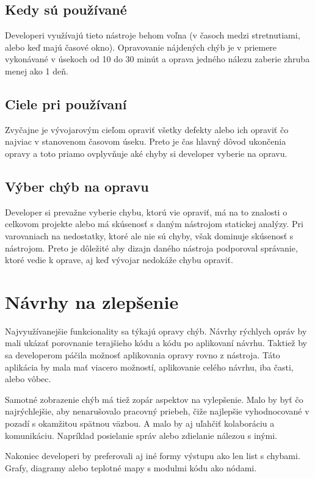 \documentclass[10pt,twoside,slovak,a4paper]{article}
\begin{document}
\subsection*{Kedy sú používané}
Developeri využívajú tieto nástroje behom voľna (v časoch medzi stretnutiami, alebo keď majú časové okno). Opravovanie
nájdených chýb je v priemere vykonávané v úsekoch od 10 do 30 minút a oprava jedného nálezu zaberie zhruba menej ako 1 deň.

\subsection*{Ciele pri používaní}
Zvyčajne je vývojarovým cieľom opraviť všetky defekty alebo ich opraviť čo najviac v stanovenom časovom úseku. Preto
je čas hlavný dôvod ukončenia opravy a toto priamo ovplyvňuje aké chyby si developer vyberie na opravu.

\subsection*{Výber chýb na opravu}
Developer si prevažne vyberie chybu, ktorú vie opraviť, má na to znalosti o celkovom projekte alebo má skúsenosť s
daným nástrojom statickej analýzy. Pri varovaniach na nedostatky, ktoré ale nie sú chyby, však dominuje skúsenosť
s nástrojom. Preto je dôležité aby dizajn daného nástroja podporoval správanie, ktoré vedie k oprave, aj keď vývojar
nedokáže chybu opraviť.

\section{Návrhy na zlepšenie} \label{navrhy}
Najvyužívanejšie funkcionality sa týkajú opravy chýb. Návrhy rýchlych opráv by mali ukázať porovnanie terajšieho kódu a
kódu po aplikovaní návrhu. Taktiež by sa developerom páčila možnosť aplikovania opravy rovno z nástroja. Táto aplikácia
by mala mať viacero možností, aplikovanie celého návrhu, iba časti, alebo vôbec.

Samotné zobrazenie chýb má tiež zopár aspektov na vylepšenie. Malo by byť čo najrýchlejšie, aby nenarušovalo pracovný
priebeh, čiže najlepšie vyhodnocované v pozadí s okamžitou spätnou väzbou. A malo by aj uľahčiť kolaboráciu a
komunikáciu. Napríklad posielanie správ alebo zdielanie nálezou s inými.

Nakoniec developeri by preferovali aj iné formy výstupu ako len list s chybami. Grafy, diagramy alebo teplotné mapy
s modulmi kódu ako nódami.\cite{BrittanyJohnson,LisaNguyen}
\end{document}
